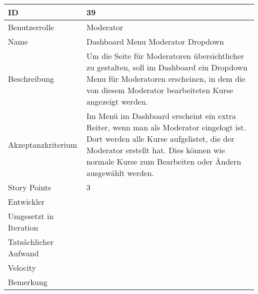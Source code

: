 \begin{tabularx}{\textwidth}{|p{}|X|}
	\hline
	ID & 39 \\
	\hline
	Benutzerrolle & Moderator \\
	\hline
	Name & Dashboard Menu Moderator Dropdown\\
	\hline
	Beschreibung & Um die Seite für Moderatoren übersichtlicher zu gestalten, soll im Dashboard ein Dropdown Menu für Moderatoren erscheinen, in dem die von diesem Moderator bearbeiteten Kurse angezeigt werden. \\
	\hline
	Akzeptanzkriterium & Im Menü im Dashboard erscheint ein extra Reiter, wenn man als Moderator eingelogt ist. Dort werden alle Kurse aufgelistet, die der Moderator erstellt hat. Dies können wie normale Kurse zum Bearbeiten oder Ändern ausgewählt werden. \\
	\hline
	Story Points & 3\\
	\hline
	Entwickler & \\
	\hline
	Umgesetzt in Iteration & \\
	\hline
	Tatsächlicher Aufwand & \\
	\hline
	Velocity & \\
	\hline
	Bemerkung & \\
	\hline
\end{tabularx}
\vspace{20pt}
